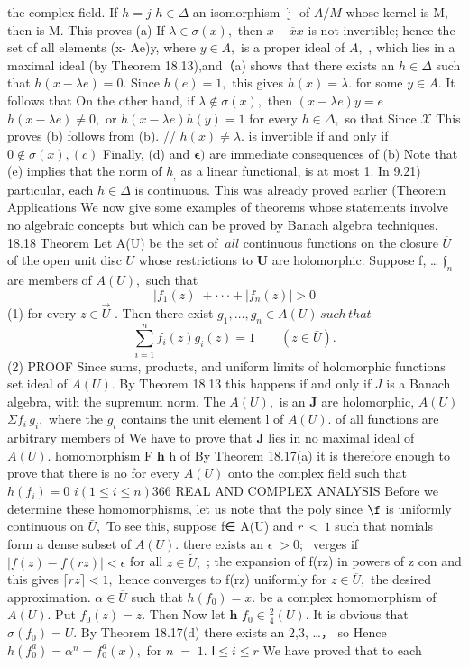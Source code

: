 the complex field. If $h=j$ $h\in\Delta$ an isomorphism $\dot{\boldsymbol{\jmath}}$ of $A/M$ whose kernel is M, then is M. This proves (a) If $\lambda\in\sigma(x),$ then $x-{\overline{{x}}}x$ is not invertible; hence the set of all elements (x- Ae)y, where $y\in A,$ is a proper ideal of $A,$ , which lies in a maximal ideal (by Theorem 18.13),and（a) shows that there exists an $h\in\Delta$ such that $h(x-\lambda e)=0.$ Since $h(e)=1,$ this gives $h(x)=\lambda.$ for some $y\in A.$ It follows that On the other hand, if $\lambda\notin\sigma(x),$ then $(x-\lambda e)y=e$ $h(x-\lambda e)\neq0,$ or $h(x-\lambda e)h(y)=1$ for every $h\in\Delta,$ so that Since $\scriptstyle{\mathcal{X}}$ This proves (b) follows from (b). // $h(x)\neq\lambda.$ is invertible if and only if $0\not\in\sigma(x),(c)$ Finally, (d) and ${\boldsymbol{\epsilon}})$ are immediate consequences of (b) Note that (e) implies that the norm of $h_{\mathrm{,}}$ as a linear functional, is at most 1. In 9.21) particular, each $h\in\Delta$ is continuous. This was already proved earlier (Theorem Applications We now give some examples of theorems whose statements involve no algebraic concepts but which can be proved by Banach algebra techniques. 18.18 Theorem Let A(U) be the set of $\ a l l$ continuous functions on the closure $\overline{{U}}$ of the open unit disc $U$ whose restrictions to ${\boldsymbol{U}}$ are holomorphic. Suppose f, … ${\mathfrak{f}}_{n}$ are members of $A(U),$ such that $$ |f_{1}(z)|+\cdot\cdot\cdot+|f_{n}(z)|>0 $$ (1) for every $z\in{\overrightarrow{U}}$ . Then there exist $g_{1},\ldots,g_{n}\in A(U)\,s u c h\,t h a t$ $$ \sum_{i=1}^{n}f_{i}(z)g_{i}(z)=1\qquad(z\in\bar{U}). $$ (2) PROOF Since sums, products, and uniform limits of holomorphic functions set ideal of $A(U).$ By Theorem 18.13 this happens if and only if ${\mathbf{}}J$ is a Banach algebra, with the supremum norm. The $A(U),$ is an $\boldsymbol{J}$ are holomorphic, $A(U)$ $\Sigma f_{i}\,g_{i},$ where the $g_{i}$ contains the unit element l of $A(U).$ of all functions are arbitrary members of We have to prove that $\boldsymbol{J}$ lies in no maximal ideal of $A(U).$ homomorphism F $\boldsymbol{h}$ h of By Theorem 18.17(a) it is therefore enough to prove that there is no for every $A(U)$ onto the complex field such that $h(f_{i})=0$ $i\left(1\leq i\leq n\right)$366 REAL AND COMPLEX ANALYSIS Before we determine these homomorphisms, let us note that the poly since $\boldsymbol{\f}$ is uniformly continuous on ${\bar{U}},$ To see this, suppose f∈ A(U) and $\scriptstyle{r\,<\,1}$ such that nomials form a dense subset of $A(U).$ there exists an $\scriptstyle\epsilon\;\!>0;\;$ verges if $|f(z)-f(r z)|<\epsilon$ for all $z\in{\tilde{U}};$ ; the expansion of f(rz) in powers of z con and this gives $\lceil r z\rceil<1,$ hence converges to f(rz) uniformly for $z\in{\overline{{U}}},$ the desired approximation. $\alpha\in{\overline{{U}}}$ such that $h(f_{0})=x.$ be a complex homomorphism of $A(U).$ Put $f_{0}(z)=z.$ Then Now let ${\boldsymbol{h}}$ $f_{0}\in{\frac{2}{4}}(U).$ It is obvious that $\sigma(f_{0})=U.$ By Theorem 18.17(d) there exists an 2,3, …， so Hence $h(f_{0}^{a})=\alpha^{n}=f_{0}^{a}(x),$ for $\scriptstyle n\;=\;1.$ ${\mathsf{I}}\leq i\leq r$ We have proved that to each 